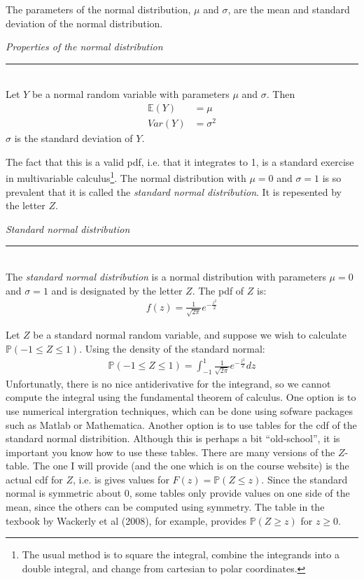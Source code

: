 \documentclass[12pt]{article}
\theoremstyle{definition}
\theoremstyle{remark}
\def\P{{\mathbb P}}
\def\E{{\mathbb E}}
\begin{document}
The parameters of the normal distribution, $\mu$ and $\sigma$, are the mean and standard deviation of the normal distribution.

\begin{framed}
\emph{Properties of the normal distribution}\\
  \rule{\dimexpr{}\fboxrule}{.1pt} \\
Let $Y$ be a normal random variable with parameters $\mu$ and $\sigma$. Then
\begin{align*}
\E(Y) &= \mu \\
Var(Y) &= \sigma^2
\end{align*}
$\sigma$ is the standard deviation of $Y$.
\end{framed}

The fact that this is a valid pdf, i.e. that it integrates to 1, is a standard exercise in multivariable calculus\footnote{The usual method is to square the integral, combine the integrands into a double integral, and change from cartesian to polar coordinates.}. The normal distribution with $\mu = 0$ and $\sigma = 1$ is so prevalent that it is called the \emph{standard normal distribution}. It is repesented by the letter $Z$. 

\begin{framed}
\emph{Standard normal distribution}\\
  \rule{\dimexpr{}\fboxrule}{.1pt} \\
The \emph{standard normal distribution} is a normal distribution with parameters $\mu = 0$ and $\sigma = 1$ and is designated by the letter $Z$. The pdf of $Z$ is:
\begin{align*}
f(z) = \frac{1}{\sqrt{2 \pi}} e^{-\frac{z^2}{2}}
\end{align*}
\end{framed}

Let $Z$ be a standard normal random variable, and suppose we wish to calculate $\P(-1 \leq Z \leq 1)$. Using the density of the standard normal:
\begin{align*}
\P(-1 \leq Z \leq 1) = \int_{-1}^1 \frac{1}{\sqrt{2 \pi}} e^{-\frac{z^2}{2}} dz
\end{align*} 
Unfortunatly, there is no nice antiderivative for the integrand, so we cannot compute the integral using the fundamental theorem of calculus. One option is to use numerical intergration techniques, which can be done using sofware packages such as Matlab or Mathematica. Another option is to use tables for the cdf of the standard normal distribition. Although this is perhaps a bit ``old-school'', it is important you know how to use these tables. There are many versions of the $Z$-table. The one I will provide (and the one which is on the course website) is the actual cdf for $Z$, i.e. is gives values for $F(z) = \P(Z \leq z)$. Since the standard normal is symmetric about 0, some tables only provide values on one side of the mean, since the others can be computed using symmetry. The table in the texbook by Wackerly et al (2008), for example, provides $\P(Z \geq z)$ for $z \geq 0$.\\
\end{document}
